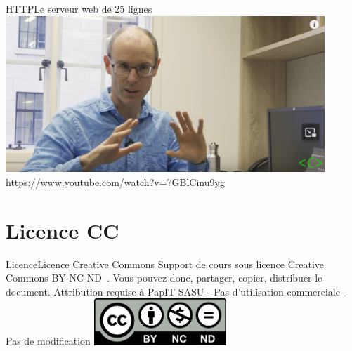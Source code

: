 \documentclass{beamer}
\begin{document}
    \begin{frame}{HTTP}{Le serveur web de 25 lignes}
        \centering
        \includegraphics[width=12cm]{image/25-lines-server} \\ \url{https://www.youtube.com/watch?v=7GBlCinu9yg} \\
    \end{frame}


    \section{Licence CC}\label{sec:licence}

    \begin{frame}{Licence}{Licence Creative Commons}
        Support de cours sous licence Creative Commons BY-NC-ND~.
        \bigbreak
        Vous pouvez donc, partager, copier, distribuer le document.
        \bigbreak
        Attribution requise à PapIT SASU - Pas d’utilisation commerciale - Pas de modification
        \bigbreak
        \centering
        \includegraphics[width=5cm]{image/by-nc-nd-logo}
    \end{frame}
\end{document}
